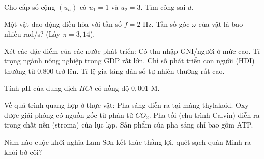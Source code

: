 \begin{ex}
    Cho cấp số cộng $(u_n)$ có $u_1 = 1$ và $u_2 = 3$. Tìm công sai $d$.
\end{ex}

\begin{ex}
    Một vật dao động điều hòa với tần số $f = 2$ Hz. Tần số góc $\omega$ của vật là bao nhiêu rad/s? (Lấy $\pi = 3,14$).
\end{ex}

\begin{ex}
    Xét các đặc điểm của các nước phát triển:
    \choiceTF
    {\True Có thu nhập GNI/người ở mức cao.}
    {Tỉ trọng ngành nông nghiệp trong GDP rất lớn.}
    {\True Chỉ số phát triển con người (HDI) thường từ 0,800 trở lên.}
    {Tỉ lệ gia tăng dân số tự nhiên thường rất cao.}
\end{ex}

\begin{ex}
    Tính pH của dung dịch $HCl$ có nồng độ $0,001$ M.
\end{ex}

\begin{ex}
    Về quá trình quang hợp ở thực vật:
    \choiceTF
    {\True Pha sáng diễn ra tại màng thylakoid.}
    {Oxy được giải phóng có nguồn gốc từ phân tử $CO_2$.}
    {\True Pha tối (chu trình Calvin) diễn ra trong chất nền (stroma) của lục lạp.}
    {Sản phẩm của pha sáng chỉ bao gồm ATP.}
\end{ex}

\begin{ex}
    Năm nào cuộc khởi nghĩa Lam Sơn kết thúc thắng lợi, quét sạch quân Minh ra khỏi bờ cõi?
\end{ex}

